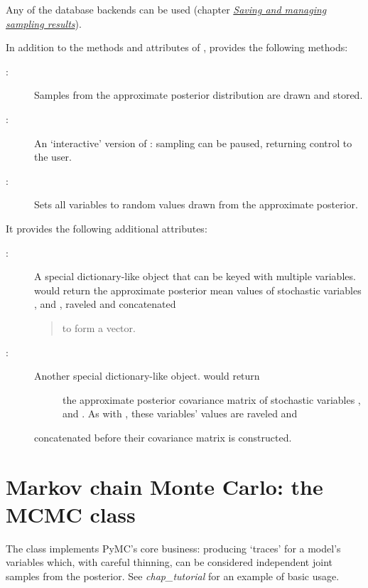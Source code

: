 \documentclass[letterpaper,10pt,english]{sphinxmanual}
\begin{document}
Any of the database backends can be used (chapter {\hyperref[database:chap-database]{\emph{Saving and managing sampling results}}}).

In addition to the methods and attributes of ,  provides the following methods:
\begin{description}
\item[{:}] \leavevmode
Samples from the approximate posterior distribution are drawn and stored.

\item[{:}] \leavevmode
An `interactive' version of : sampling can be paused, returning
control to the user.

\item[{:}] \leavevmode
Sets all variables to random values drawn from the approximate posterior.

\end{description}

It provides the following additional attributes:
\begin{description}
\item[{:}] \leavevmode
A special dictionary-like object that can be keyed with multiple variables.
 would return the approximate posterior mean values of
stochastic variables ,  and , raveled and concatenated
\begin{quote}

to form a vector.
\end{quote}

\item[{:}] \leavevmode\begin{description}
\item[{Another special dictionary-like object.  would return}] \leavevmode
the approximate posterior covariance matrix of stochastic variables ,
 and . As with , these variables' values are raveled and

\end{description}

concatenated before their covariance matrix is constructed.

\end{description}


\section{Markov chain Monte Carlo: the MCMC class}
\label{modelfitting:sec-mcmc}\label{modelfitting:markov-chain-monte-carlo-the-mcmc-class}
The  class implements PyMC's core business: producing `traces' for a model's variables which, with careful thinning, can be considered independent joint samples from the posterior. See \emph{chap\_tutorial} for an example of basic usage.
\end{document}
